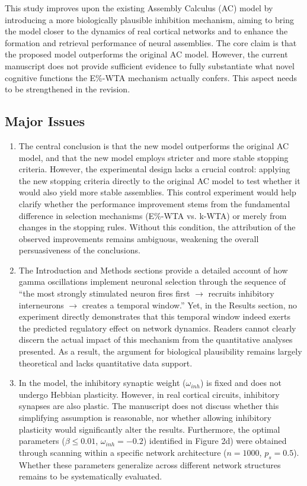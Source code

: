 \documentclass[a4paper, 11pt]{article}
\begin{document}
This study improves upon the existing Assembly Calculus (AC) model by introducing a more biologically plausible inhibition mechanism, aiming to bring the model closer to the dynamics of real cortical networks and to enhance the formation and retrieval performance of neural assemblies. The core claim is that the proposed model outperforms the original AC model. However, the current manuscript does not provide sufficient evidence to fully substantiate what novel cognitive functions the E\%-WTA mechanism actually confers. This aspect needs to be strengthened in the revision.

\subsection*{Major Issues}
\begin{enumerate}
    \item The central conclusion is that the new model outperforms the original AC model, and that the new model employs stricter and more stable stopping criteria. However, the experimental design lacks a crucial control: applying the new stopping criteria directly to the original AC model to test whether it would also yield more stable assemblies. This control experiment would help clarify whether the performance improvement stems from the fundamental difference in selection mechanisms (E\%-WTA vs. k-WTA) or merely from changes in the stopping rules. Without this condition, the attribution of the observed improvements remains ambiguous, weakening the overall persuasiveness of the conclusions.
    
    \item The Introduction and Methods sections provide a detailed account of how gamma oscillations implement neuronal selection through the sequence of ``the most strongly stimulated neuron fires first $\rightarrow$ recruits inhibitory interneurons $\rightarrow$ creates a temporal window.'' Yet, in the Results section, no experiment directly demonstrates that this temporal window indeed exerts the predicted regulatory effect on network dynamics. Readers cannot clearly discern the actual impact of this mechanism from the quantitative analyses presented. As a result, the argument for biological plausibility remains largely theoretical and lacks quantitative data support.
    
    \item In the model, the inhibitory synaptic weight ($\omega_{inh}$) is fixed and does not undergo Hebbian plasticity. However, in real cortical circuits, inhibitory synapses are also plastic. The manuscript does not discuss whether this simplifying assumption is reasonable, nor whether allowing inhibitory plasticity would significantly alter the results. Furthermore, the optimal parameters ($\beta \le 0.01$, $\omega_{inh} = -0.2$) identified in Figure 2d) were obtained through scanning within a specific network architecture ($n = 1000$, $p_s = 0.5$). Whether these parameters generalize across different network structures remains to be systematically evaluated.
    

\end{enumerate}
\end{document}
